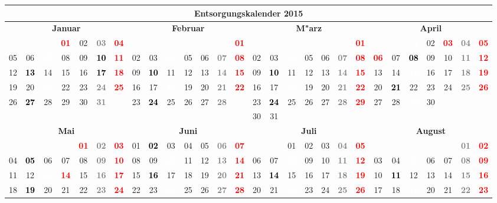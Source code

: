 \documentclass[10pt,a4paper,landscape]{article}
\newcommand{\gb}[1]{\cellcolor{SpringGreen}\textcolor{black}{\bf #1}}
\newcommand{\yb}[1]{\cellcolor{yellow}\textcolor{black}{\bf #1}}
\newcommand{\iv}[1]{\cellcolor{black}\textcolor{white}{\bf #1}}
\newcommand{\rb}[1]{\textbf{\textcolor{red}{#1}}}
\newcommand{\hv}[1]{\textbf{\textcolor{Gray}{#1}}}
\begin{document}
\begin{tabular}{|ccccccc|ccccccc|ccccccc|ccccccc|}
\hline
\multicolumn{28}{|c|}{\textbf{Entsorgungskalender 2015}} \\\hline
\multicolumn{7}{|c|}{\bf Januar} & \multicolumn{7}{|c|}{\bf Februar} & \multicolumn{7}{|c|}{\bf M"arz} & \multicolumn{7}{|c|}{\bf April} \\
& & & \rb{01} & 02 & \hv{03} & \rb{04} & & & & & & & \rb{01} & & & & & & & \rb{01} &  &  & \iv{01} & 02 & \rb{03} & \hv{04} & \rb{05} \\
05 & 06 & \iv{07} & 08 & 09 & \gb{10} & \rb{11} & 02 & 03 & \iv{04} & 05 & 06 & \hv{07} & \rb{08} & 02 & 03 & \iv{04} & 05 & 06 & \hv{07} & \rb{08} & \rb{06} & 07 & \yb{08} & 09 & 10 & \hv{11} & \rb{12} \\
12 & \yb{13} & 14 & 15 & 16 & \gb{17} & \rb{18} & 09 & \yb{10} & 11 & 12 & 13 & \hv{14} & \rb{15} & 09 & \yb{10} & 11 & 12 & 13 & \hv{14} & \rb{15} & 13 & 14 & \iv{15} & 16 & 17 & \hv{18} & \rb{19} \\
19 & 20 & \iv{21} & 22 & 23 & \hv{24} & \rb{25} & 16 & 17 & \iv{18} & 19 & 20 & \hv{21} & \rb{22} & 16 & 17 & \iv{18} & 19 & 20 & \hv{21} & \rb{22} & 20 & \yb{21} & 22 & 23 & 24 & \hv{25} & \rb{26} \\
26 & \yb{27} & 28 & 29 & 30 & \hv{31} & & 23 & \yb{24} & 25 & 26 & 27 & \hv{28} & & 23 & \yb{24} & 25 & 26 & 27 & \hv{28} & \rb{29} & 27 & 28 & \iv{29} & 30 &  &  &  \\
& & & & & & & & & & & & & & 30 & 31 & & & & & &  &  &  &  &  &  &  \\
\hline
\multicolumn{7}{|c|}{\bf Mai} & \multicolumn{7}{|c|}{\bf Juni} & \multicolumn{7}{|c|}{\bf Juli} & \multicolumn{7}{|c|}{\bf August} \\
& & & & \rb{01} & \hv{02} & \rb{03} & 01 & \yb{02} & 03 & 04 & 05 & \hv{06} & \rb{07} & & & 01 & 02 & 03 & \hv{04} & \rb{05} & & & & & & \hv{01} & \rb{02} \\
04 & \yb{05} & 06 & 07 & 08 & \hv{09} & \rb{10} & 08 & 09 & \iv{10} & 11 & 12 & \hv{13} & \rb{14} & 06 & 07 & \iv{08} & 09 & 10 & \hv{11} & \rb{12} & 03 & 04 & \iv{05} & 06 & 07 & \hv{08} & \rb{09} \\
11 & 12 & \iv{13} & \rb{14} & 15 & \hv{16} & \rb{17} & 15 & \yb{16} & 17 & 18 & 19 & \hv{20} & \rb{21} & 13 & \yb{14} & 15 & 16 & 17 & \hv{18} & \rb{19} & 10 & \yb{11} & 12 & 13 & 14 & \hv{15} & \rb{16} \\
18 & \yb{19} & 20 & 21 & 22 & \hv{23} & \rb{24} & 22 & 23 & \iv{24} & 25 & 26 & \hv{27} & \rb{28} & 20 & 21 & \iv{22} & 23 & 24 & \hv{25} & \rb{26} & 17 & 18 & \iv{19} & 20 & 21 & \hv{22} & \rb{23} \\

\end{tabular}
\end{document}
